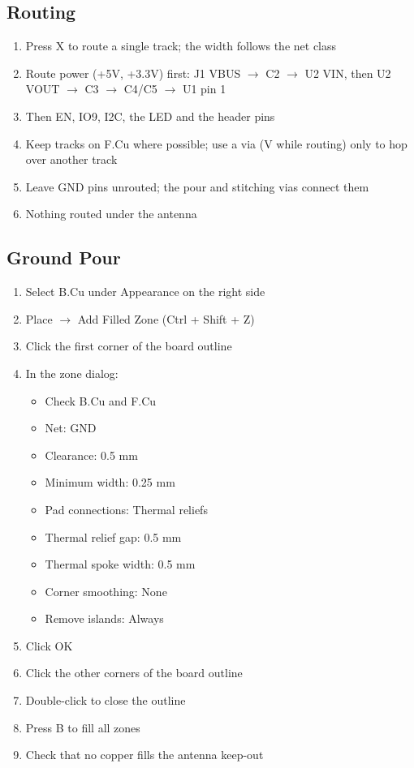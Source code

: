 \documentclass[11pt]{article}
\begin{document}
\subsection{Routing}
\begin{enumerate}
	\item Press X to route a single track; the width follows the net class
	\item Route power (+5V, +3.3V) first: J1 VBUS $\rightarrow$ C2
	$\rightarrow$ U2 VIN, then U2 VOUT $\rightarrow$ C3 $\rightarrow$ C4/C5
	$\rightarrow$ U1 pin 1
	\item Then EN, IO9, I2C, the LED and the header pins
	\item Keep tracks on F.Cu where possible; use a via (V while routing)
	only to hop over another track
	\item Leave GND pins unrouted; the pour and stitching vias connect them
	\item Nothing routed under the antenna
\end{enumerate}

\subsection{Ground Pour}
\begin{enumerate}
	\item Select B.Cu under Appearance on the right side
	\item Place $\rightarrow$ Add Filled Zone (Ctrl + Shift + Z)
	\item Click the first corner of the board outline
	\item In the zone dialog:
	\begin{itemize}
		\item Check B.Cu and F.Cu
		\item Net: GND
		\item Clearance: 0.5 mm
		\item Minimum width: 0.25 mm
		\item Pad connections: Thermal reliefs
		\item Thermal relief gap: 0.5 mm
		\item Thermal spoke width: 0.5 mm
		\item Corner smoothing: None
		\item Remove islands: Always
	\end{itemize}
	\item Click OK
	\item Click the other corners of the board outline
	\item Double-click to close the outline
	\item Press B to fill all zones
	\item Check that no copper fills the antenna keep-out
\end{enumerate}
\end{document}
